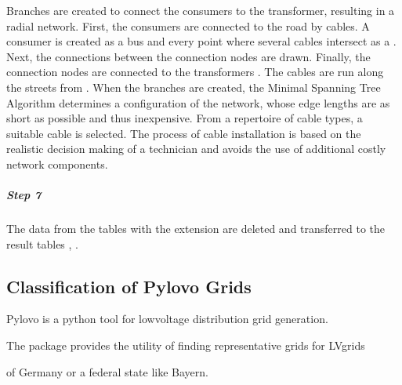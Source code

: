 \documentclass[letterpaper,10pt,english]{sphinxmanual}
\begin{document}
\sphinxAtStartPar
Branches are created to connect the consumers to the transformer, resulting in a radial network.
First, the consumers are connected to the road by cables.
A consumer is created as a  bus and every point
where several cables intersect as a . Next, the connections between the connection
nodes are drawn. Finally,
the connection nodes are connected to the transformers .
The cables are run along the streets from . When the branches are created, the
Minimal Spanning Tree Algorithm determines a configuration of the network,
whose edge lengths are as short as possible and thus inexpensive. From a
repertoire of cable types, a suitable cable is selected. The process of
cable installation is based on the realistic decision making of a technician
and avoids the use of additional costly network components.


\subparagraph{Step 7}
\label{\detokenize{grid_generation/explanation/grid_generation_process:step-7}}

\begin{fulllineitems}
\label{\detokenize{grid_generation/explanation/grid_generation_process:syngrid.pgReaderWriter.PgReaderWriter.saveInformationAndResetTables}}
\pysigstartsignatures
{}
\pysigstopsignatures
\end{fulllineitems}


\sphinxAtStartPar
The data from the tables with the extension
 are deleted and transferred to the result tables ,
.

\sphinxstepscope


\subsection{Classification of Pylovo Grids}
\label{\detokenize{classification/index:classification-of-pylovo-grids}}\label{\detokenize{classification/index::doc}}
\begin{DUlineblock}{0em}
\item[] Pylovo is a python tool for low\sphinxhyphen{}voltage distribution grid generation.
\item[] The package  provides the utility of finding representative grids for LV\sphinxhyphen{}grids
\item[] of Germany or a federal state like Bayern.
\end{DUlineblock}
\end{document}
